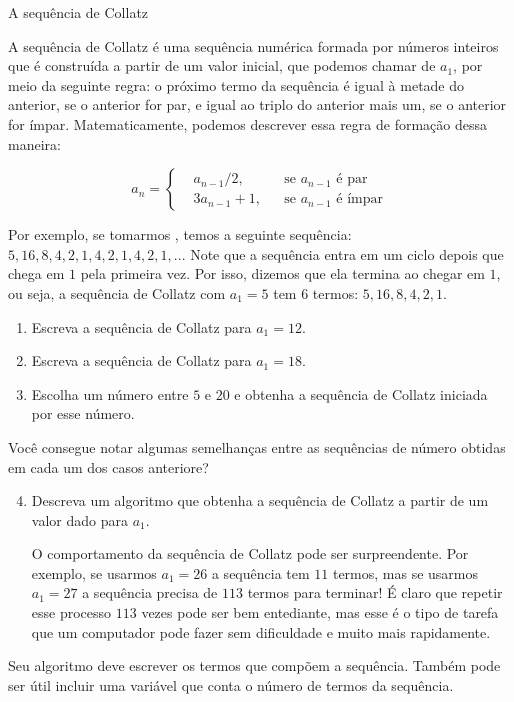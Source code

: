 \newpage

\begin{task}{A sequência de Collatz}

A sequência de Collatz é uma sequência numérica formada por números inteiros que é construída a partir de um valor inicial, que podemos chamar de $a_1$, por meio da seguinte regra: o próximo termo da sequência é igual à metade do anterior, se o anterior for par, e igual ao triplo do anterior mais um, se o anterior for ímpar. Matematicamente, podemos descrever essa regra de formação dessa maneira:

$$a_n=\left \{
\begin{aligned}
&a_{n-1}/2, & & \text{se }a_{n-1}\text{ é par} \\
&3a_{n-1}+1, & & \text{se }a_{n-1}\text{ é ímpar} 
\end{aligned}
\right.$$

Por exemplo, se tomarmos , temos a seguinte sequência: $5, 16, 8, 4, 2, 1, 4, 2, 1, 4, 2, 1, ..$. Note que a sequência entra em um ciclo depois que chega em $1$ pela primeira vez. Por isso, dizemos que ela termina ao chegar em $1$, ou seja, a sequência de Collatz com $a_1=5$ tem $6$ termos: $5, 16, 8, 4, 2, 1$.

\begin{enumerate}
\item Escreva a sequência de Collatz para $a_1=12$.

\item Escreva a sequência de Collatz para $a_1=18$.

\item Escolha um número entre $5$ e $20$ e obtenha a sequência de Collatz iniciada por esse número.
\end{enumerate}

\begin{reflection}
Você consegue notar algumas semelhanças entre as sequências de número obtidas em cada um dos casos anteriore?
\end{reflection}

\begin{enumerate}\setcounter{enumi}{3}
\item Descreva um algoritmo que obtenha a sequência de Collatz a partir de um valor dado para $a_1$.

O comportamento da sequência de Collatz pode ser surpreendente. Por exemplo, se usarmos $a_1=26$ a sequência tem $11$ termos, mas se usarmos $a_1=27$ a sequência precisa de $113$ termos para terminar! É claro que repetir esse processo $113$ vezes pode ser bem entediante, mas esse é o tipo de tarefa que um computador pode fazer sem dificuldade e muito mais rapidamente.

\end{enumerate}

\begin{observation}
Seu algoritmo deve escrever os termos que compõem a sequência. Também pode ser útil incluir uma variável que conta o número de termos da sequência.
\end{observation}
\end{task}


